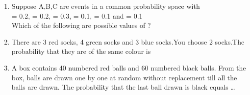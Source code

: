 \renewcommand{\theequation}{\theenumi}
\renewcommand{\thefigure}{\theenumi}
\renewcommand{\thetable}{\theenumi}
\begin{enumerate}[label=\thesection.\arabic*.,ref=\thesection.\theenumi]

\item Suppose A,B,C are events in a common probability space with \\
 = 0.2, = 0.2, = 0.3, = 0.1, = 0.1 and = 0.1\\
Which of the following are possible values of  ?
\begin{enumerate}
  \end{enumerate}
\solution

\item There are 3 red socks, 4 green socks and 3 blue socks.You choose 2 socks.The probability that they are of the same colour is

\begin{enumerate}
\end{enumerate}
\solution

%
\item A box contains 40 numbered red balls and 60 numbered black balls. From the box, balls are drawn one by one at random without replacement till all the balls are drawn. The probability that the last ball drawn is black equals \dots



\end{enumerate}
